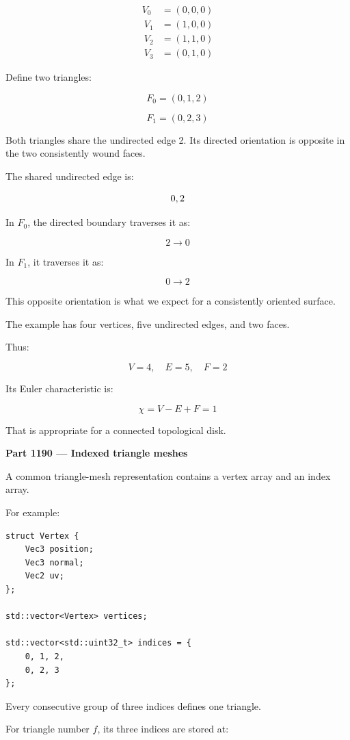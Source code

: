 \[
\begin{aligned} V_0&=(0,0,0)\\\ V_1&=(1,0,0)\\\ V_2&=(1,1,0)\\\ V_3&=(0,1,0) \end{aligned}
\]

Define two triangles:

\[
F_0=(0,1,2)
\]

\[
F_1=(0,2,3)
\]

Both triangles share the undirected edge 2. Its directed orientation is opposite in the two consistently wound faces.

The shared undirected edge is:

\[
\\{0,2\\}
\]

In \(F_0\), the directed boundary traverses it as:

\[
2\rightarrow0
\]

In \(F_1\), it traverses it as:

\[
0\rightarrow2
\]

This opposite orientation is what we expect for a consistently oriented surface.

The example has four vertices, five undirected edges, and two faces.

Thus:

\[
V=4,\quad E=5,\quad F=2
\]

Its Euler characteristic is:

\[
\chi=V-E+F=1
\]

That is appropriate for a connected topological disk.

\textbf{Part 1190 --- Indexed triangle meshes}

A common triangle-mesh representation contains a vertex array and an index array.

For example:

\begin{verbatim}
struct Vertex {
    Vec3 position;
    Vec3 normal;
    Vec2 uv;
};

std::vector<Vertex> vertices;

std::vector<std::uint32_t> indices = {
    0, 1, 2,
    0, 2, 3
};
\end{verbatim}

Every consecutive group of three indices defines one triangle.

For triangle number \(f\), its three indices are stored at:

